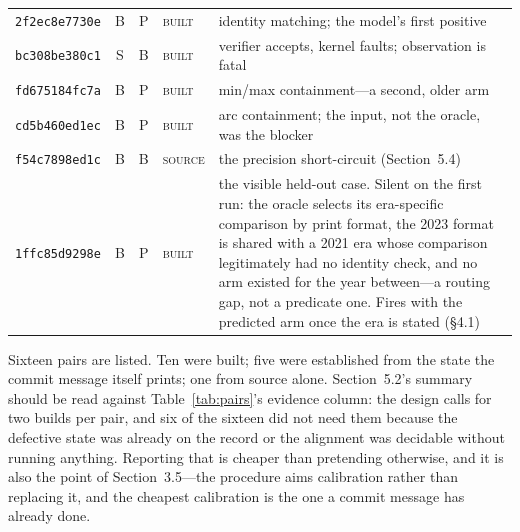 \begin{table}[H]
\begin{tabular}{@{}l@{\hspace{4pt}}c@{\hspace{4pt}}c@{\hspace{4pt}}l@{\hspace{4pt}}p{}@{}}
\texttt{2f2ec8e7730e} & B & P & \textsc{built} & identity matching; the model's first positive \\
\texttt{bc308be380c1} & S & B & \textsc{built} & verifier accepts, kernel faults; observation is fatal \\
\texttt{fd675184fc7a} & B & P & \textsc{built} & min/max containment---a second, older arm \\
\texttt{cd5b460ed1ec} & B & P & \textsc{built} & arc containment; the input, not the oracle, was the blocker \\
\texttt{f54c7898ed1c} & B & B & \textsc{source} & the precision short-circuit (Section~5.4) \\
\texttt{1ffc85d9298e} & B & P & \textsc{built} & the visible held-out case. Silent on the first run: the oracle selects its era-specific comparison by print format, the 2023 format is shared with a 2021 era whose comparison legitimately had no identity check, and no arm existed for the year between---a routing gap, not a predicate one. Fires with the predicted arm once the era is stated (\S4.1) \\
\bottomrule
\end{tabular}
\end{table}

\noindent Sixteen pairs are listed. Ten were built; five were established from the
state the commit message itself prints; one from source alone. Section~5.2's summary
should be read against Table~\ref{tab:pairs}'s evidence column: the design calls for
two builds per pair, and six of the sixteen did not need them because the defective
state was already on the
record or the alignment was decidable without running anything. Reporting that is
cheaper than pretending otherwise, and it is also the point of Section~3.5---the
procedure aims calibration rather than replacing it, and the cheapest calibration is
the one a commit message has already done.
